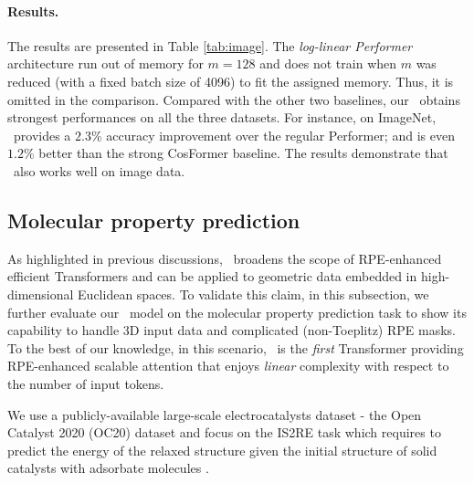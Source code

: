 \paragraph{Results.}
The results are presented in Table \ref{tab:image}. The \textit{log-linear Performer} architecture run out of memory for $m=128$ and does not train when $m$ was reduced (with a fixed batch size of 4096) to fit the assigned memory. Thus, it is omitted in the comparison. Compared with the other two baselines, our \FLT~obtains strongest performances on all the three datasets. For instance, on ImageNet, \FLT~provides a $\mathbf{2.3}$\% accuracy improvement over the regular Performer; and is even $\mathbf{1.2}$\% better than the strong CosFormer baseline. The results demonstrate that \FLT~also works well on image data.

\subsection{Molecular property prediction}
\label{sec:molecular_dynamics}

As highlighted in previous discussions, \FLT~broadens the scope of RPE-enhanced efficient Transformers and can be applied to geometric data embedded in high-dimensional Euclidean spaces. To validate this claim, in this subsection, we further evaluate our \FLT~model on the molecular property prediction task to show its capability to handle 3D input data and complicated (non-Toeplitz) RPE masks. To the best of our knowledge, in this scenario, \FLT~is the \textit{first} Transformer providing RPE-enhanced scalable attention that enjoys \textit{linear} complexity with respect to the number of input tokens.

We use a publicly-available large-scale electrocatalysts dataset - the Open Catalyst 2020 (OC20) dataset and focus on the IS2RE task which requires to predict the energy of the relaxed structure given the initial structure of solid catalysts with adsorbate molecules \cite{ocp_dataset}.

